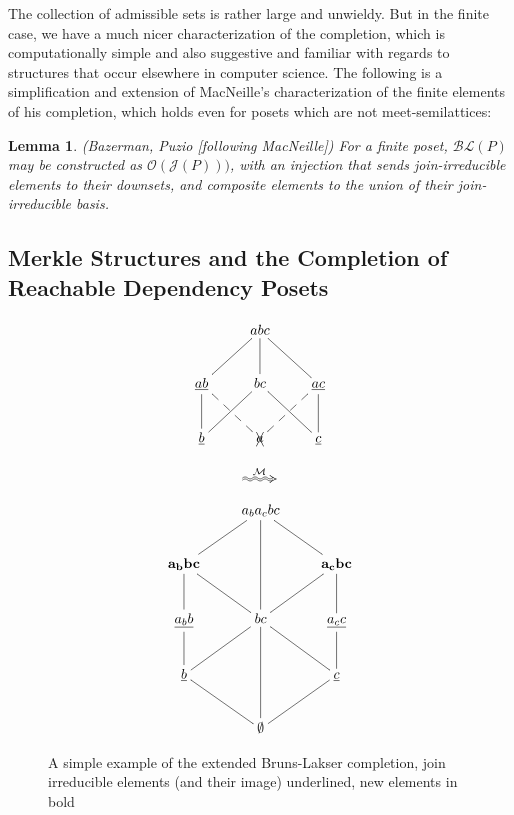 \documentclass[hoptionsi,review,format=acmsmall]{acmart}
\newtheorem{lemma}[theorem]{Lemma}
\theoremstyle{definition}
\newcommand{\Mcc}{\mathcal{M}}
\newcommand{\Oc}{\mathcal{O}}
\newcommand{\Jc}{\mathcal{J}}
\newcommand{\BLc}{\mathcal{BL}}
\begin{document}

The collection of admissible sets is rather large and unwieldy. But in the finite case, we have a much nicer characterization of the completion, which is computationally simple and also suggestive and familiar with regards to structures that occur elsewhere in computer science. The following is a simplification and extension of MacNeille's characterization of the finite elements of his completion, which holds even for posets which are not meet-semilattices:

\begin{lemma}
(Bazerman, Puzio [following MacNeille]) For a finite poset, \(\BLc(P)\) may be constructed as \(\Oc(\Jc(P)))\), with an injection that sends join-irreducible elements to their downsets, and composite elements to the union of their join-irreducible basis.
\end{lemma}

\subsection{Merkle Structures and the Completion of Reachable Dependency Posets}


\begin{figure}
\begin{minipage}[c]{0.3\textwidth}
\begin{equation*}
    \xymatrix{& abc \ar@{-}[dl] \ar@{-}[d] \ar@{-}[dr] & \\
      \underline{ab} \ar@{-}[d] \ar@{--}[dr] & bc \ar@{-}[dl] \ar@{-}[dr] &
        \underline{ac} \ar@{-}[d] \ar@{--}[dl] \\
        \underline{b} & \xcancel{a}  & \underline{c} }         
\end{equation*}
\end{minipage}
\begin{minipage}[c]{0.08\textwidth}
  \begin{equation*}
    \xymatrix{\ar@2{~>}[r]^{\Mcc} &}
  \end{equation*}
\end{minipage}
\begin{minipage}[c]{0.3\textwidth}
\begin{equation*}
    \xymatrix{& a_ba_cbc \ar@{-}[dl] \ar@{-}[dd] \ar@{-}[dr] & \\
      \mathbf{a_bbc} \ar@{-}[d] \ar@{-}[dr] & &
        \mathbf{a_cbc} \ar@{-}[d] \ar@{-}[dl]\\
        \underline{a_bb} \ar@{-}[d] & bc \ar@{-}[dl] \ar@{-}[dd] \ar@{-}[dr] &
          \underline{a_cc} \ar@{-}[d] \\
         \underline{b} \ar@{-}[dr] & & \underline{c} \ar@{-}[dl] \\
      & \mathbf{\emptyset} }
\end{equation*}
\end{minipage}
\caption{A simple example of the extended Bruns-Lakser completion, join irreducible elements (and their image) underlined, new elements in bold}
\label{Fig1}
\end{figure}
\end{document}
